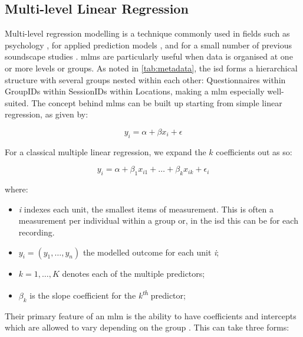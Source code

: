 \subsection{Multi-level Linear Regression}

Multi-level regression modelling is a technique commonly used in fields such as psychology \citep{Quene2004multi,VolpertEsmond2021Using}, for applied prediction models \citep{Gelman2006Multilevel,Frees2006Multilevel}, and for a small number of previous soundscape studies \citep{Aumond2017Modeling}. \glspl{mlm} are particularly useful when data is organised at one or more levels or groups. As noted in \cref{tab:metadata}, the \gls{isd} forms a hierarchical structure with several groups nested within each other: Questionnaires within GroupIDs within SessionIDs within Locations, making a \gls{mlm} especially well-suited. The concept behind \glspl{mlm} can be built up starting from simple linear regression, as given by:

\begin{equation}
  y_i = \alpha + \beta x_i + \epsilon
\end{equation}

For a classical multiple linear regression, we expand the $k$ coefficients out as so:

\begin{equation}
  \label{eqn:classicRegressModel}
  y_i = \alpha + \beta_1 x_{i1} + \ldots + \beta_k x_{ik} + \epsilon_i
\end{equation}

where:

\begin{itemize}
  \item \emph{i} indexes each unit, the smallest items of measurement. This is often a measurement per individual within a group or, in the \gls{isd} this can be for each recording.
  \item $y_i = (y_1, \ldots, y_n)$ the modelled outcome for each unit \emph{i};
  \item $k = 1, \dots, K$ denotes each of the multiple predictors;
  \item $\beta_k$ is the slope coefficient for the \emph{k\textsuperscript{th}} predictor;
\end{itemize}

Their primary feature of an \gls{mlm} is the ability to have coefficients and intercepts which are allowed to vary depending on the group \citep{Gelman2006Multilevel}. This can take three forms:

